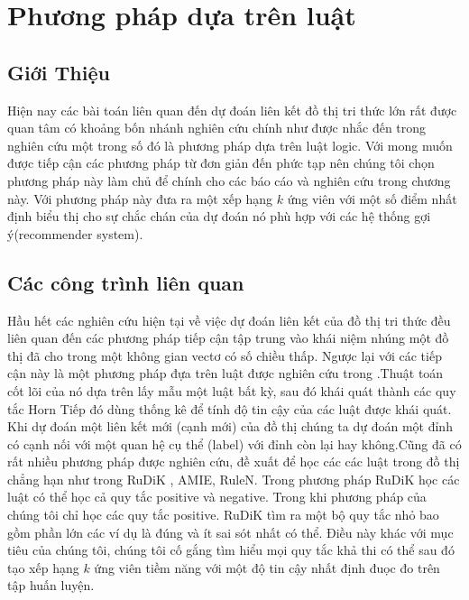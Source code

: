 \chapter{Phương pháp dựa trên luật}
\label{chap:RuleBase}

\section{Giới Thiệu}

Hiện nay các bài toán liên quan đến dự đoán liên kết đồ thị tri thức lớn rất được quan tâm có khoảng bốn nhánh nghiên cứu chính như được nhắc đến trong nghiên cứu \cite{ampligraph} một trong số đó là phương pháp dựa trên luật logic. Với mong muốn được tiếp cận các phương pháp từ đơn giản đến phức tạp nên chúng tôi chọn phương pháp này làm chủ để chính cho các báo cáo và nghiên cứu trong chương này. Với phương pháp này đưa ra một xếp hạng \(k\) ứng viên với một số điểm nhất định biểu thị cho sự chắc chán của dự đoán nó phù hợp với các hệ thống gợi ý(recommender system).

\section{Các công trình liên quan}
Hầu hết các nghiên cứu hiện tại về việc dự đoán liên kết của đồ thị tri thức đều liên quan đến các phương pháp tiếp cận tập trung vào khái niệm nhúng một đồ thị đã cho trong một không gian vectơ có số chiều thấp. Ngược lại với các tiếp cận này là một phương pháp đựa trên luật được nghiên cứu trong \cite{burl}.Thuật toán cốt lõi của nó dựa trên lấy mẫu một luật bất kỳ, sau đó khái quát  thành các quy tắc Horn\cite{wiki:Horn} Tiếp đó dùng thống kê để tính độ tin cậy của các luật được khái quát. Khi dự đoán một liên kết mới (cạnh mới) của đồ thị chúng ta dự đoán một đỉnh có cạnh nối với một quan hệ cụ thể (label) với đỉnh còn lại hay không.Cũng đã có rất nhiều phương pháp được nghiên cứu, đề xuất để học các các luật trong đồ thị chẳng hạn như trong   RuDiK \cite{dettmers2018convolutional}, AMIE\cite{galarraga2015fast}, RuleN\cite{meilicke2018fine}. Trong phương pháp RuDiK học các luật có thể học cả quy tắc positive và negative. Trong khi phương pháp của chúng tôi chỉ học các quy tắc positive. RuDiK tìm ra một bộ quy tắc nhỏ bao gồm phần lớn các ví dụ là đúng và ít sai sót nhất có thể. Điều này khác với mục tiêu của chúng tôi, chúng tôi cố gắng tìm hiểu mọi quy tắc khả thi có thể sau đó tạo xếp hạng \(k\) ứng viên tiềm năng với một độ tin cậy nhất định đuọc đo trên tập huấn luyện.

